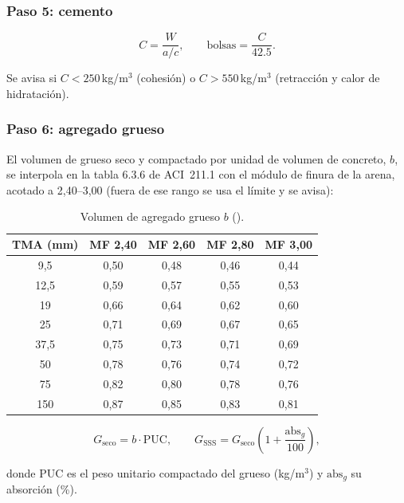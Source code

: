 \subsubsection{Paso 5: cemento}

\begin{equation}
	C = \frac{W}{a/c}, \qquad \text{bolsas} = \frac{C}{42.5} .
\end{equation}

Se avisa si $C < 250$\,kg/m$^3$ (cohesión) o $C > 550$\,kg/m$^3$ (retracción y calor de hidratación).

\subsubsection{Paso 6: agregado grueso}

El volumen de grueso seco y compactado por unidad de volumen de concreto, $b$, se interpola en la tabla 6.3.6 de
ACI~211.1 con el módulo de finura de la arena, acotado a 2,40--3,00 (fuera de ese rango se usa el límite y se avisa):

\begin{table}[H]
	\centering
	\caption{Volumen de agregado grueso $b$ ().}
	\label{tab:con-grueso}
	\begin{tabular}{ccccc}
		\hline
		\textbf{TMA (mm)} & \textbf{MF 2,40} & \textbf{MF 2,60} & \textbf{MF 2,80} & \textbf{MF 3,00} \\ \hline
		9,5 & 0,50 & 0,48 & 0,46 & 0,44 \\
		12,5 & 0,59 & 0,57 & 0,55 & 0,53 \\
		19 & 0,66 & 0,64 & 0,62 & 0,60 \\
		25 & 0,71 & 0,69 & 0,67 & 0,65 \\
		37,5 & 0,75 & 0,73 & 0,71 & 0,69 \\
		50 & 0,78 & 0,76 & 0,74 & 0,72 \\
		75 & 0,82 & 0,80 & 0,78 & 0,76 \\
		150 & 0,87 & 0,85 & 0,83 & 0,81 \\
		\hline
	\end{tabular}
\end{table}

\begin{equation}
	G_{\text{seco}} = b \cdot \mathrm{PUC}, \qquad G_{\text{SSS}} = G_{\text{seco}} \left(1 + \frac{\text{abs}_g}{100}\right),
\end{equation}

\noindent donde PUC es el peso unitario compactado del grueso (kg/m$^3$) y $\text{abs}_g$ su absorción (\%).

